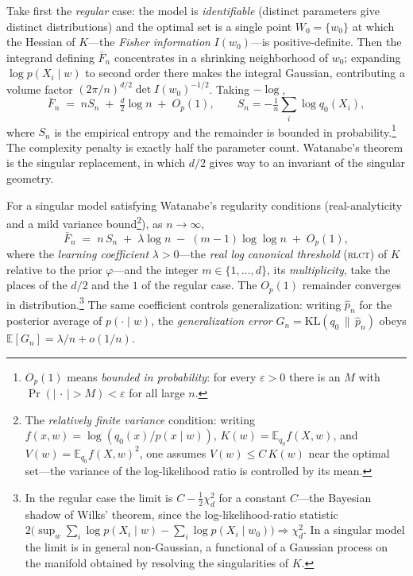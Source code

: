 Take first the \emph{regular} case: the model is \emph{identifiable} (distinct parameters give distinct distributions) and the optimal set is a single point $W_0=\{w_0\}$ at which the Hessian of $K$---the \emph{Fisher information} $I(w_0)$---is positive-definite. Then the integrand defining $\bar F_n$ concentrates in a shrinking neighborhood of $w_0$; expanding $\log p(X_i\mid w)$ to second order there makes the integral Gaussian, contributing a volume factor $(2\pi/n)^{d/2}\det I(w_0)^{-1/2}$. Taking $-\log$,
\[
   \bar F_n \;=\; nS_n \;+\; \tfrac{d}{2}\log n \;+\; O_p(1),
   \qquad S_n=-\tfrac1n\textstyle\sum_i\log q_0(X_i),
\]
where $S_n$ is the empirical entropy and the remainder is bounded in probability.\footnote{$O_p(1)$ means \emph{bounded in probability}: for every $\varepsilon>0$ there is an $M$ with $\Pr(|\,\cdot\,|>M)<\varepsilon$ for all large $n$.} The complexity penalty is exactly half the parameter count. Watanabe's theorem is the singular replacement, in which $d/2$ gives way to an invariant of the singular geometry.

\begin{theorem*}
For a singular model satisfying Watanabe's regularity conditions (real-analyticity and a mild variance bound\footnote{The \emph{relatively finite variance} condition: writing $f(x,w)=\log(q_0(x)/p(x\mid w))$, $K(w)=\mathbb{E}_{q_0} f(X,w)$, and $V(w)=\mathbb{E}_{q_0} f(X,w)^2$, one assumes $V(w)\le C\,K(w)$ near the optimal set---the variance of the log-likelihood ratio is controlled by its mean.}), as $n\to\infty$,
\begin{equation}\label{eq:free-energy}
   \bar F_n \;=\; n\,S_n \;+\; \lambda\log n \;-\; (m-1)\log\log n \;+\; O_p(1),
\end{equation}
where the \emph{learning coefficient} $\lambda>0$---the \emph{real log canonical threshold} (\textup{\textsc{rlct}}) of $K$ relative to the prior $\varphi$---and the integer $m\in\{1,\dots,d\}$, its \emph{multiplicity}, take the places of the $d/2$ and the $1$ of the regular case. The $O_p(1)$ remainder converges in distribution.\footnote{In the regular case the limit is $C-\tfrac12\chi^2_d$ for a constant $C$---the Bayesian shadow of Wilks' theorem, since the log-likelihood-ratio statistic $2\bigl(\sup_w\textstyle\sum_i\log p(X_i\mid w)-\sum_i\log p(X_i\mid w_0)\bigr)\Rightarrow\chi^2_d$. In a singular model the limit is in general non-Gaussian, a functional of a Gaussian process on the manifold obtained by resolving the singularities of $K$.} The same coefficient controls generalization: writing $\hat p_n$ for the posterior average of $p(\cdot\mid w)$, the \emph{generalization error} $G_n=\mathrm{KL}(q_0\,\|\,\hat p_n)$ obeys $\mathbb{E}[G_n]=\lambda/n+o(1/n)$.
\end{theorem*}


